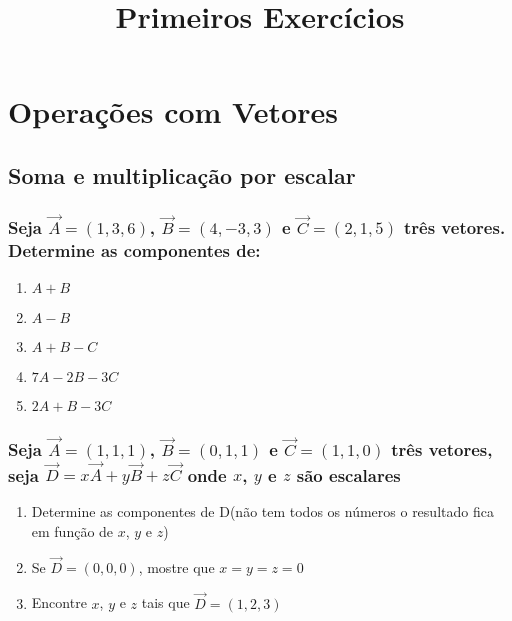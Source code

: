 \documentclass[a4paper,10pt]{article}
\title{Primeiros Exercícios}
\author{}
\begin{document}
\maketitle

\section{Operações com Vetores}

\subsection{Soma e multiplicação por escalar}

\subsubsection{Seja $\vec{A}=(1,3,6)$, $\vec{B}=(4,-3,3)$ e $\vec{C}=(2,1,5)$ três vetores. Determine as componentes de:}

\begin{enumerate}
 \item $A + B$
 \item $A - B$
 \item $A + B -C$
 \item $7A - 2B - 3C$
 \item $2A + B - 3C$
\end{enumerate}

\subsubsection{Seja $\vec{A}=(1,1,1)$, $\vec{B}=(0,1,1)$ e $\vec{C}=(1,1,0)$ três vetores, seja 
$\vec{D}=x\vec{A} + y\vec{B} + z\vec{C}$ onde $x$, $y$ e $z$ são escalares}

\begin{enumerate}
 \item Determine as componentes de D(não tem todos os números o resultado fica em função de $x$, $y$ e $z$)
 \item Se $\vec{D}=(0,0,0)$, mostre que $x=y=z=0$
 \item Encontre $x$, $y$ e $z$ tais que $\vec{D}=(1,2,3)$
\end{enumerate}
\end{document}
